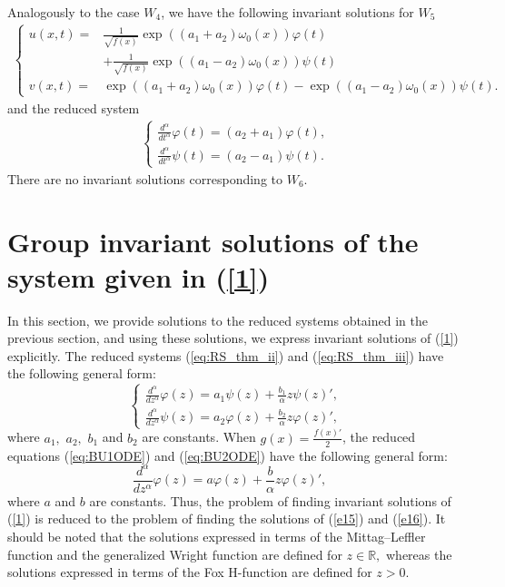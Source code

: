 \documentclass[12pt]{amsart}
\begin{document}
Analogously to the case $W_4$, we have the following invariant solutions for $W_5$
\begin{align}\label{eq:ST_thm_iv_U2}
\begin{cases}
u(x,t)=&\frac{1}{\sqrt{f(x)}}\exp \left((a_1+a_2)\omega_{0}(x)\right)\varphi(t)\\
&+\frac{1}{\sqrt{f(x)}}\exp \left((a_1-a_2)\omega_{0}(x)\right)\psi(t)
\\
v(x,t)=&\exp \left((a_1+a_2)\omega_{0}(x)\right)\varphi(t)-\exp \left((a_1-a_2)\omega_{0}(x)\right)\psi(t).
\end{cases}
\end{align}
and the reduced system
\begin{eqnarray}
\label{eq:BU2ODE}
\begin{cases}
\frac{d^{\alpha}}{dt^{\alpha}}\varphi(t)=(a_2+a_1)\varphi(t), \\
\frac{d^{\alpha}}{dt^{\alpha}}\psi(t)=(a_2-a_1)\psi(t).
\end{cases}
\end{eqnarray}
There are no invariant solutions corresponding to $W_6$.

\section{Group invariant solutions of the system given in (\ref{1})}

In this section, we provide solutions to the reduced systems obtained in the previous section, and using these solutions, we express invariant solutions of (\ref{1}) explicitly.
The reduced systems (\ref{eq:RS_thm_ii}) and (\ref{eq:RS_thm_iii})  have the following general form:
\begin{equation}\label{e15}
\begin{cases}
\displaystyle{\frac{d^\alpha}{d z^\alpha}}\varphi(z) = a_1\psi(z)+\frac{b_1}{\alpha}z \psi(z)',\\
\displaystyle{\frac{d^\alpha}{d z^\alpha}}\psi(z) = a_2\varphi(z)+\frac{b_2}{\alpha} z\varphi(z)',
\end{cases}
\end{equation}
where  $a_1,$ $a_2,$ $b_1$ and $b_2$ are constants. When $g(x)=\frac{f(x)'}{2}$, the reduced equations (\ref{eq:BU1ODE}) and (\ref{eq:BU2ODE}) have the following general form:
\begin{equation}\label{e16}
\frac{d^\alpha}{d z^\alpha}\varphi(z) = a\varphi(z)+\frac{b}{\alpha}z \varphi(z)',\quad
\end{equation}
where $a$ and $b$ are constants.
Thus, the problem of finding invariant solutions of (\ref{1}) is reduced to the problem of finding the solutions of (\ref{e15}) and (\ref{e16}). It should be noted that the solutions expressed in terms of the Mittag--Leffler function and the generalized Wright function are defined for $z\in\mathbb{R},$ whereas the solutions expressed in terms of the Fox H-function are defined for $z>0$.
\end{document}
